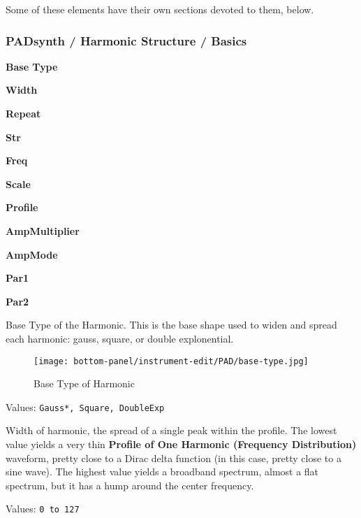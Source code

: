    Some of these elements have their own sections devoted to them, below.

\subsubsection{PADsynth / Harmonic Structure / Basics}
\label{subsubsec:padsynth_harmonic_structure_basics}

   \begin{enumber}
      \item \textbf{Base Type}
      \item \textbf{Width}
      \item \textbf{Repeat}
      \item \textbf{Str}
      \item \textbf{Freq}
      \item \textbf{Scale}
      \item \textbf{Profile}
      \item \textbf{AmpMultiplier}
      \item \textbf{AmpMode}
      \item \textbf{Par1}
      \item \textbf{Par2}
   \end{enumber}

   \setcounter{ItemCounter}{0}      %

   Base Type of the Harmonic.
   This is the base shape used to widen and spread each harmonic:
   gauss, square, or double explonential.

\begin{figure}[H]
   \centering
   \texttt{[image: bottom-panel/instrument-edit/PAD/base-type.jpg]}
   \caption{Base Type of Harmonic}
   \label{fig:padsynth_base_type_of_harmonic}
\end{figure}

   Values: \texttt{Gauss*, Square, DoubleExp}

   Width of harmonic, the spread of a single peak within the profile.
   The lowest value yields a very thin
   \textbf{Profile of One Harmonic (Frequency Distribution)}
   waveform, pretty close to a Dirac delta function (in this case, pretty close
   to a sine wave).
   The highest value yields a broadband spectrum, almost a flat spectrum, but
   it has a hump around the center frequency.

   Values: \texttt{0 to 127}

